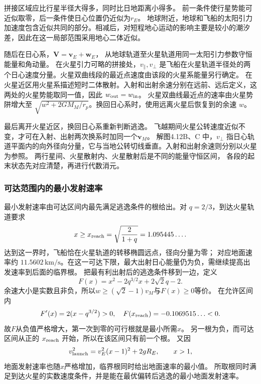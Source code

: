 \documentclass[UTF8,fontset=fandol,a4paper,11pt]{ctexart}
\newcommand{\vect}[1]{\bm{#1}}
\begin{document}
拼接区域应比行星半径大得多，同时比日地距离小得多。
前一条件使行星势能可近似取零，后一条件使日心位置仍近似为$r_E$。
地球附近，地球和飞船的太阳引力加速度包含近似共同的部分。相减后，对短程地心运动的影响主要是较小的潮汐差，因此在这一局部范围采用地心二体近似。

随后在日心系，$\vect V=\vect v_E+\vect w_E$，
从地球轨道至火星轨道用同一太阳引力参数守恒能量和角动量。
在火星引力可略的拼接处，$v_\parallel,v_\perp$ 是飞船在火星轨道半径处的两个日心速度分量。火星双曲线段的最近点速度由该段的火星系能量另行确定。
在火星近区用火星系描述短时二体散射。入射和出射余速分别在远前、远后定义，这两处的火星势能取同一值，因此 $w_{\rm out}=w_{\rm in}$。
火星双曲线最近点的速率由火星势阱增大至 $\sqrt{w^2+2GM_M/r_p}$。换回日心系时，使用远离火星后恢复到的余速 $w$。

最后离开火星近区，换回日心系重新判断逃逸。
飞越期间火星公转速度近似不变，才可在入射、出射两次换系时加同一个$\vect v_M$。
解图4.12B、C 中，$v_\perp$ 指日心轨道平面内的向外径向分量，它与当地公转切线垂直。入射和出射余速则分别以火星为参照。
两行星间、火星散射内、火星散射后是不同的能量守恒区间，
各段的起末状态先对应清楚，再进行代数消元。

\subsubsection*{可达范围内的最小发射速率}
最小发射速率由可达区间内最先满足逃逸条件的根给出。对 $q=2/3$，到达火星轨道要求
\[
x\geq x_{\rm reach}=\sqrt{\frac{2}{1+q}}
=1.095445\ldots.
\]
达到这一界时，飞船恰在火星轨道的转移椭圆远点，径向分量为零；
对应地面速率约 $11.5602\,\mathrm{km/s}$。在这一可达下限，最大出射日心能量仍为负，需继续提高出发速率到后面的临界根。
把最有利出射后的逃逸条件移到一边，定义
\[
F(x)=x^2-2q^{3/2}x+2\sqrt2q-2.
\]
余速大小是实数且非负，所以$w\geq(\sqrt2-1)v_M$与$F(x)\geq0$等价。
在允许区间内
\[
F'(x)=2(x-q^{3/2})>0,
\quad
F(x_{\rm reach})=-0.1069515\ldots<0.
\]
故$F$从负值严格增大，第一次到零的可行根就是最小所需$x$。
另一根为负，而可达区间从正的 $x_{\rm reach}$ 开始，所以在该区间只有前一个根。
又因
\[
v_{\rm launch}^2=v_E^2(x-1)^2+2gR_E,\qquad x>1,
\]
地面发射速率也随$x$严格增加，临界根同时给出地面速率的最小值。
所取根同时满足到达火星的实数速度条件，并是能在最优偏转后逃逸的最小地面发射速率。
\end{document}
